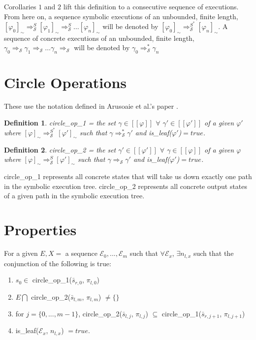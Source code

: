 \documentclass[a4paper]{article}
\newtheorem{define}{Definition}
\begin{document}
Corollaries $1$ and $2$ lift this definition to a consecutive sequence of executions. From here on, a sequence symbolic executions of an unbounded, finite length, $[\varphi_0]_{\sim} \Rightarrow_{\mathcal{S}}^S [\varphi_1]_{\sim} \Rightarrow_{\mathcal{S}}^S \ldots [\varphi_n]_{\sim}$ will be denoted by $[\varphi_0]_{\sim} \Rightarrow_{\mathcal{S}}^{S^*} [\varphi_n]_{\sim} $. A sequence of concrete executions of an unbounded, finite length, $\gamma_0  \Rightarrow_{\mathcal{S}} \gamma_1  \Rightarrow_{\mathcal{S}} \ldots \gamma_n  \Rightarrow_{\mathcal{S}}$ will be denoted by $\gamma_0   \Rightarrow_{\mathcal{S}}^{*}  \gamma_n $

\section{Circle Operations}
These use the notation defined in Arusoaie et al.'s paper \cite{arusoaie2013generic}.

\begin{define}
circle\_op\_1 = the set $\gamma \in [\![\varphi ]\!] $ $\forall$  $\gamma' \in [\![\varphi' ]\!]$ of a given $\varphi'$ where $[\varphi]_{\sim} \Rightarrow_{\mathcal{S}}^{S^*} [\varphi']_{\sim}$ such that $\gamma \Rightarrow_{\mathcal{S}}^* \gamma'$ and is\_leaf($\varphi'$)$ = true$.
\end{define}

\begin{define}
circle\_op\_2 = the set $\gamma' \in [\![\varphi' ]\!] $ $\forall$  $\gamma \in [\![\varphi ]\!]$ of a given $\varphi$ where $[\varphi]_{\sim} \Rightarrow_{\mathcal{S}}^S [\varphi']_{\sim}$ such that $\gamma \Rightarrow_{\mathcal{S}} \gamma'$ and is\_leaf($\varphi'$)$ = true$.
\end{define}


circle\_op\_1 represents all concrete states that will take us down exactly one path in the symbolic execution tree. circle\_op\_2 represents all concrete output states of a given path in the symbolic execution tree.

\section{Properties}
For a given $E, X = $ a sequence $\mathcal{E}_0, ..., \mathcal{E}_m$ such that $\forall \mathcal{E}_x$, $\exists n_{l,x}$ such that the conjunction of the following is true:
\begin{enumerate}
\item $s_0 \in$ circle\_op\_1($\bar{s}_{r,0} $, $\pi_{l,0}$)
\item $E \bigcap$ circle\_op\_2($\bar{s}_{l,m} $, $\pi_{l,m}$) $\neq \{\}$
\item for $j = \{0,...,m-1\}$, circle\_op\_2($\bar{s}_{l,j} $, $\pi_{l,j}$) $\subseteq$ circle\_op\_1($\bar{s}_{r,j+1} $, $\pi_{l,j+1}$)
\item is\_leaf($\mathcal{E}_x$, $n_{l,x}$) $= true$.
\end{enumerate}
\end{document}
